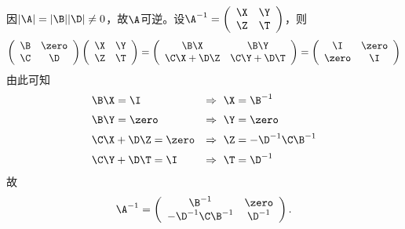 \begin{frame}\ft{\secname}
\begin{jie}
  因$|\A|=|\B||\D|\ne 0$，故$\A$可逆。\pause 设$\A^{-1}=\left(
    \begin{array}{cc}
      \X&\Y\\
      \Z&\T
    \end{array}
  \right)$，则
  $$
  \left(
    \begin{array}{cc}
      \B&\zero\\
      \C&\D
    \end{array}
  \right) \left(
    \begin{array}{cc}
      \X&\Y\\
      \Z&\T
    \end{array}
  \right)=\left(
    \begin{array}{cc}
      \B\X&\B\Y\\
      \C\X+\D\Z&\C\Y+\D\T
    \end{array}
  \right) = \left(
    \begin{array}{cc}
      \I & \zero\\
      \zero & \I
    \end{array}
  \right)
  $$
\pause
  由此可知
  $$
  \begin{array}{ll}
    \B\X = \I   & \Rightarrow ~ \X = \B^{-1}\\[0.2cm]
    \B\Y = \zero & \Rightarrow ~ \Y = \zero\\[0.2cm]
    \C\X+\D\Z = \zero & \Rightarrow ~ \Z = -\D^{-1}\C\B^{-1}\\[0.2cm]
    \C\Y+\D\T = \I & \Rightarrow ~ \T = \D^{-1}
  \end{array}
  $$
\pause
  故
  $$
  \A^{-1} = \left(
    \begin{array}{cc}
      \B^{-1} & \zero\\
      -\D^{-1}\C\B^{-1} & \D^{-1}
    \end{array}
  \right).
  $$
\end{jie}
\end{frame}

